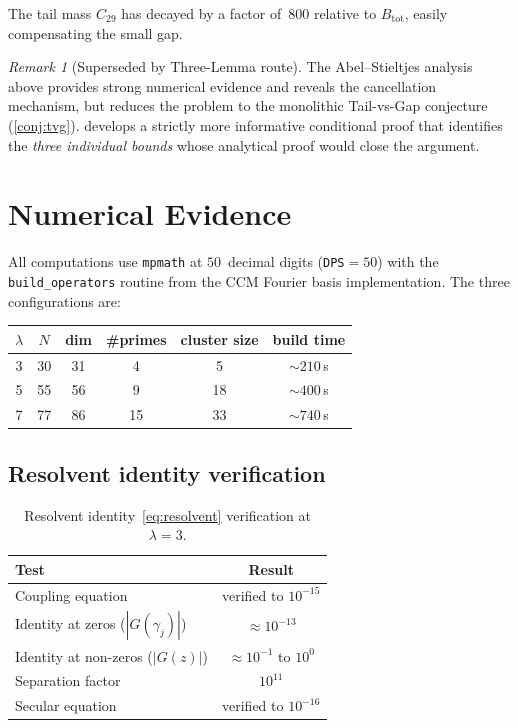 \documentclass[12pt,a4paper]{article}
\theoremstyle{definition}
\theoremstyle{remark}
\newtheorem{remark}[theorem]{Remark}
\begin{document}
The tail mass $C_{29}$ has decayed by a factor of~$800$ relative
to $B_{\mathrm{tot}}$, easily compensating the small gap.

\begin{remark}[Superseded by Three-Lemma route]
The Abel--Stieltjes analysis above provides strong numerical evidence
and reveals the cancellation mechanism, but reduces the problem to the
monolithic Tail-vs-Gap conjecture (\cref{conj:tvg}).
 develops a strictly more informative conditional
proof that identifies the \emph{three individual bounds} whose
analytical proof would close the argument.
\end{remark}

\section{Numerical Evidence}
\label{sec:numerics}

All computations use \texttt{mpmath} at $50$~decimal digits
(\texttt{DPS}$=50$) with the \texttt{build\_operators} routine
from the CCM Fourier basis implementation.
The three configurations are:

\begin{center}
\begin{tabular}{cccccc}
\toprule
$\lambda$ & $N$ & dim & \#primes & cluster size & build time \\
\midrule
3 & 30 & 31 & 4 & 5 & $\sim 210$\,s \\
5 & 55 & 56 & 9 & 18 & $\sim 400$\,s \\
7 & 77 & 86 & 15 & 33 & $\sim 740$\,s \\
\bottomrule
\end{tabular}
\end{center}

\subsection{Resolvent identity verification}

\begin{table}[h]
\centering
\caption{Resolvent identity~\eqref{eq:resolvent} verification at $\lambda = 3$.}
\label{tab:resolvent}
\begin{tabular}{lc}
\toprule
Test & Result \\
\midrule
Coupling equation & verified to $10^{-15}$ \\
Identity at zeros ($|G(\gamma_j)|$) & $\approx 10^{-13}$ \\
Identity at non-zeros ($|G(z)|$) & $\approx 10^{-1}$ to $10^{0}$ \\
Separation factor & $10^{11}$ \\
Secular equation & verified to $10^{-16}$ \\
\bottomrule
\end{tabular}
\end{table}
\end{document}
